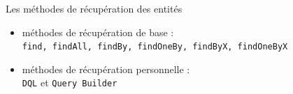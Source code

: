 \begin{frame}
	\begin{block}{Les méthodes de récupération des entités}
		\begin{itemize}
			\item méthodes de récupération de base : \\
			 \texttt{find, findAll, findBy, findOneBy, findByX, findOneByX}
			\item méthodes de récupération personnelle : \\
			\texttt{DQL} et \texttt{Query Builder}
		\end{itemize}
	  \end{block}
\end{frame}

